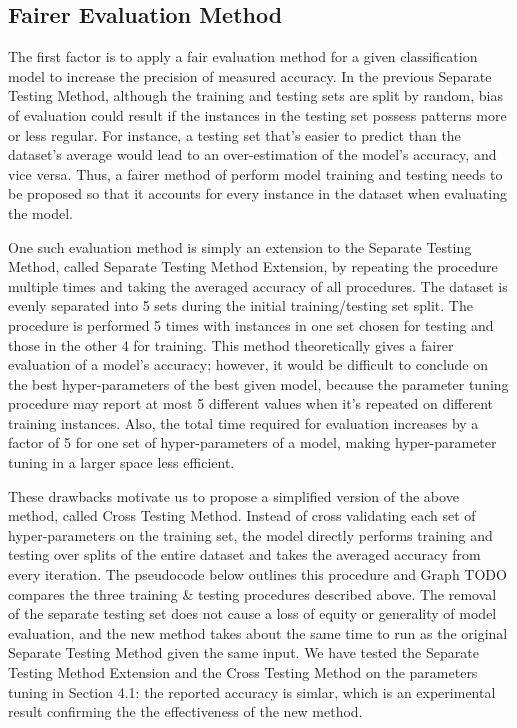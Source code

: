 \documentclass[letterpaper,twocolumn,10pt]{article}
\begin{document}
\subsection{Fairer Evaluation Method}

The first factor is to apply a fair evaluation method for a given classification model to increase the precision of measured accuracy. In the previous Separate Testing Method, although the training and testing sets are split by random, bias of evaluation could result if the instances in the testing set possess patterns more or less regular. For instance, a testing set that's easier to predict than the dataset's average would lead to an over-estimation of the model's accuracy, and vice versa. Thus, a fairer method of perform model training and testing needs to be proposed so that it accounts for every instance in the dataset when evaluating the model. 

One such evaluation method is simply an extension to the Separate Testing Method, called Separate Testing Method Extension, by repeating the procedure multiple times and taking the averaged accuracy of all procedures. The dataset is evenly separated into 5 sets during the initial training/testing set split. The procedure is performed 5 times with instances in one set chosen for testing and those in the other 4 for training. This method theoretically gives a fairer evaluation of a model's accuracy; however, it would be difficult to conclude on the best hyper-parameters of the best given model, because the parameter tuning procedure may report at most 5 different values when it's repeated on different training instances. Also, the total time required for evaluation increases by a factor of 5 for one set of hyper-parameters of a model, making hyper-parameter tuning in a larger space less efficient.

These drawbacks motivate us to propose a simplified version of the above method, called Cross Testing Method. Instead of cross validating each set of hyper-parameters on the training set, the model directly performs training and testing over splits of the entire dataset and takes the averaged accuracy from every iteration. The pseudocode below outlines this procedure and Graph TODO compares the three training \& testing procedures described above. The removal of the separate testing set does not cause a loss of equity or generality of model evaluation, and the new method takes about the same time to run as the original Separate Testing Method given the same input. We have tested the Separate Testing Method Extension and the Cross Testing Method on the parameters tuning in Section 4.1: the reported accuracy is simlar, which is an experimental result confirming the the effectiveness of the new method.
\end{document}
